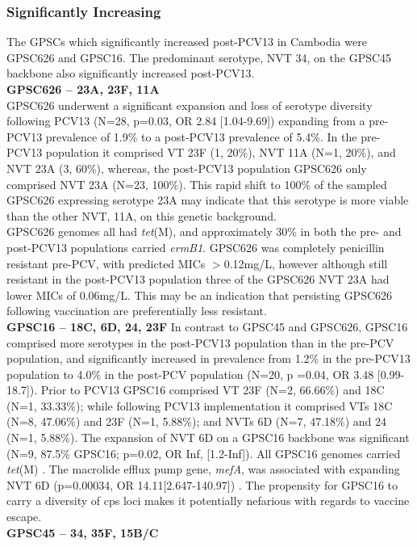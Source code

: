 \documentclass{article}
\begin{document}
\subsubsection{Significantly Increasing} 
 The GPSCs which significantly increased post-PCV13 in Cambodia were GPSC626 and GPSC16. The predominant serotype, NVT 34, on the GPSC45 backbone also significantly increased post-PCV13. 
\\\textbf{GPSC626 – 23A, 23F, 11A}
\\GPSC626 underwent a significant expansion and loss of serotype diversity following PCV13 (N=28, p=0.03, OR 2.84 [1.04-9.69]) expanding from a pre-PCV13 prevalence of 1.9\% to a post-PCV13 prevalence of 5.4\%.  In the pre-PCV13 population it comprised VT 23F (1, 20\%), NVT 11A (N=1, 20\%), and NVT 23A (3, 60\%), whereas, the post-PCV13 population GPSC626 only comprised NVT 23A (N=23, 100\%).  This rapid shift to 100\% of the sampled GPSC626 expressing serotype 23A may indicate that this serotype is more viable than the other NVT, 11A, on this genetic background. 
\\GPSC626 genomes all had \textit{tet}(M), and approximately 30\% in both the pre- and post-PCV13 populations carried \textit{ermB1}. GPSC626 was completely penicillin resistant pre-PCV, with predicted MICs $>$0.12mg/L, however although still resistant in the post-PCV13 population three of the GPSC626 NVT 23A had lower MICs of 0.06mg/L. This may be an indication that persisting GPSC626 following vaccination are preferentially less resistant.
\\\textbf{GPSC16 – 18C, 6D, 24, 23F}
In contrast to GPSC45 and GPSC626, GPSC16 comprised more serotypes in the post-PCV13 population than in the pre-PCV population, and significantly increased in prevalence from 1.2\% in the pre-PCV13 population to 4.0\% in the post-PCV population (N=20, p =0.04, OR 3.48 [0.99-18.7]). Prior to PCV13 GPSC16 comprised VT 23F (N=2, 66.66\%) and 18C (N=1, 33.33\%); while following PCV13 implementation it comprised VTs 18C (N=8, 47.06\%) and 23F (N=1, 5.88\%); and NVTs 6D (N=7, 47.18\%) and 24 (N=1, 5.88\%). The expansion of NVT 6D on a GPSC16 backbone was significant (N=9, 87.5\% GPSC16; p=0.02, OR Inf, [1.2-Inf]). All GPSC16 genomes carried \textit{tet}(M) . The macrolide efflux pump gene, \textit{mefA}, was associated with expanding NVT 6D (p=0.00034, OR 14.11[2.647-140.97]) .  The propensity for GPSC16 to carry a diversity of cps loci makes it potentially nefarious with regards to vaccine escape. 
\\\textbf{GPSC45 – 34, 35F, 15B/C}
\end{document}
